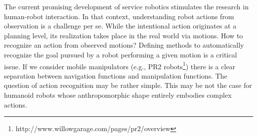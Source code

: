 \documentclass[letterpaper, 10pt, conference]{ieeeconf}      %
\begin{document}
The current promising development of service robotics stimulates the
research in human-robot interaction. In that context, understanding
robot actions from observation is a challenge per se. While the
intentional action originates at a planning level, its realization takes
place in the real world via motions. How to recognize an action from
observed motions? Defining methods to automatically recognize the goal
pursued by a robot performing a given motion is a critical issue. If we
consider mobile manipulators (e.g., PR2 robots\footnote{{http://www.willowgarage.com/pages/pr2/overview}})
there is a clear separation between navigation functions and
manipulation functions. The question of action recognition may be rather
simple. This may be not the case for humanoid robots whose
anthropomorphic shape entirely embodies complex actions. 
\end{document}
